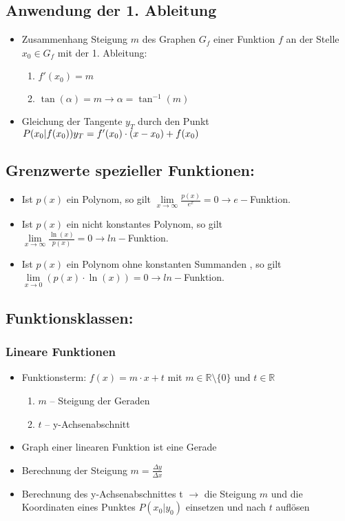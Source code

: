 \documentclass[a4paper,twocolumn,10pt]{onepgnote}
\begin{document}
\subsection{Anwendung der 1. Ableitung}
\begin{itemize}
\item Zusammenhang Steigung $m$ des Graphen $G_f$ einer Funktion $f$ an der Stelle $x_0 \in G_f$ mit der 1. Ableitung:\\
\begin{enumerate}
\item $f'(x_0) = m$\\
\item $\tan{(\alpha)} = m \longrightarrow \alpha = \tan^{-1}{(m)}$
\end{enumerate}
\item Gleichung der Tangente $y_T$ durch den Punkt $P(x_0|f(x_0)) \\y_T = f'(x_0)\cdot(x-x_0) + f(x_0) $
\end{itemize}
\subsection{Grenzwerte spezieller Funktionen:}
\begin{itemize}
\item Ist $p(x)$ ein Polynom, so gilt $\lim \limits_{x\longrightarrow \infty} \frac{p(x)}{e^x} = 0 \longrightarrow e-$Funktion.
\item Ist $p(x)$ ein nicht konstantes Polynom, so gilt \\$\lim \limits_{x\longrightarrow \infty} \frac{\ln(x)}{p(x)} = 0 \longrightarrow ln-$Funktion.
\item Ist $p(x)$ ein Polynom ohne konstanten Summanden , so gilt \\$\lim \limits_{x\longrightarrow 0} (p(x)\cdot \ln(x)) = 0\longrightarrow ln-$Funktion.
\end{itemize}
\subsection{Funktionsklassen:}
\subsubsection{Lineare Funktionen} 
\begin{itemize}
\item Funktionsterm: $f(x) = m\cdot x +t$ mit $m\in \mathds{R}\setminus\{0\}$ und $t\in \mathds{R}$ 
  \begin{enumerate}
  \item $m$ – Steigung der Geraden
  \item $t$ – y-Achsenabschnitt
  \end{enumerate}
  \item Graph einer linearen Funktion ist eine Gerade 
  \item Berechnung der Steigung $ m=\frac{\Delta y}{\Delta x}$
  \item Berechnung des y-Achsenabschnittes t $\longrightarrow$ die Steigung $m$ und die Koordinaten eines Punktes $P(x_0|y_0)$ einsetzen und nach $t$ auflösen
\end{itemize}
\end{document}
